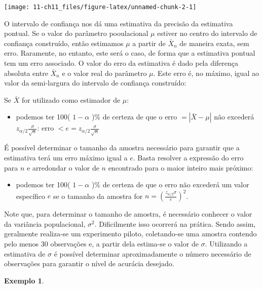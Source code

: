 \documentclass[
]{book}
\providecommand{\tightlist}{%
  \setlength{\itemsep}{0pt}\setlength{\parskip}{0pt}}
\theoremstyle{definition}
\theoremstyle{definition}
\newtheorem{example}{Exemplo}[chapter]
\theoremstyle{definition}
\theoremstyle{remark}
\begin{document}
\texttt{[image: 11-ch11\_files/figure-latex/unnamed-chunk-2-1]}

O intervalo de confiança nos dá uma estimativa da precisão da estimativa pontual. Se o valor do parâmetro pooulacional \(\mu\) estiver no centro do intervalo de confiança construído, então estimamos \(\mu\) a partir de \(\bar{X}_n\) de maneira exata, sem erro. Raramente, no entanto, este será o caso, de forma que a estimativa pontual tem um erro associado. O valor do erro da estimativa é dado pela diferença absoluta entre \(\bar{X}_n\) e o valor real do parâmetro \(\mu\). Este erro é, no máximo, igual ao valor da semi-largura do intervalo de confiança construído:

Se \(\bar{X}\) for utilizado como estimador de \(\mu\):

\begin{itemize}
\tightlist
\item
  podemos ter 100( \(1-\alpha\) )\% de certeza de que o erro \(= |\bar{X} - \mu|\) não excederá \(z_{\alpha/2}\frac{\sigma}{\sqrt{n}}\):
  erro \(< e = z_{ \alpha/2}\frac{\sigma}{\sqrt{n}}\)
\end{itemize}

É possível determinar o tamanho da amostra necessário para garantir que a estimativa terá um erro máximo igual a \(e\). Basta resolver a expressão do erro para \(n\) e arredondar o valor de \(n\) encontrado para o maior inteiro mais próximo:

\begin{itemize}
\tightlist
\item
  podemos ter 100( \(1-\alpha\) )\% de certeza de que o erro não excederá um valor específico \(e\) se o tamanho da amostra for
  \(n = \left( \frac{z_{\alpha/2}\sigma}{e} \right)^2\).
\end{itemize}

Note que, para determinar o tamanho de amostra, é necessário conhecer o valor da variância populacional, \(\sigma^2\). Dificilmente isso ocorrerá na prática. Sendo assim, geralmente realiza-se um experimento piloto, coletando-se uma amostra contendo pelo menos 30 observações e, a partir dela estima-se o valor de \(\sigma\). Utilizando a estimativa de \(\sigma\) é possível determinar aproximadamente o número necessário de observações para garantir o nível de acurácia desejado.

\begin{example}
\protect\hypertarget{exm:unnamed-chunk-3}{}{\label{exm:unnamed-chunk-3} }
\end{example}
\end{document}

